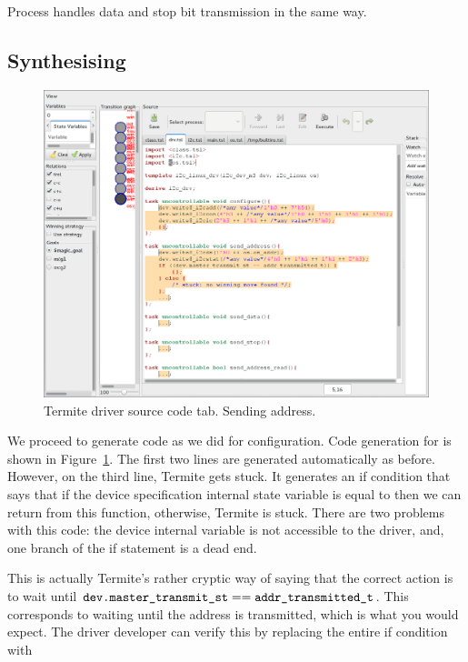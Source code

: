Process  handles data and stop bit transmission in the same way.

\subsection{Synthesising}

\begin{figure}
    \center
    \includegraphics[width=\linewidth]{imgs/screenshot_3.png}
    \caption{Termite driver source code tab. Sending address.}
    \label{fig:driver_tab_addr}
\end{figure}

We proceed to generate code as we did for configuration. Code generation for  is shown in Figure~\ref{fig:driver_tab_addr}. The first two lines are generated automatically as before. However, on the third line, Termite gets stuck. It generates an if condition that says that if the device specification internal state variable  is equal to  then we can return from this function, otherwise, Termite is stuck. There are two problems with this code: the device internal variable is not accessible to the driver, and, one branch of the if statement is a dead end. 

This is actually Termite's rather cryptic way of saying that the correct action is to wait until $\texttt{dev.master\_transmit\_st} == \texttt{addr\_transmitted\_t}$. This corresponds to waiting until the address is transmitted, which is what you would expect. The driver developer can verify this by replacing the entire if condition with 


